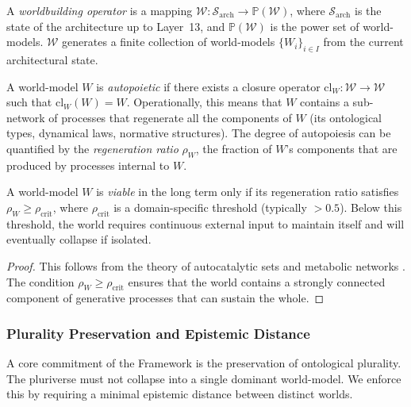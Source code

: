 \begin{definition}
A \emph{worldbuilding operator} is a mapping $\mathcal{W}: \mathcal{S}_{\text{arch}} \to \mathbb{P}(\mathcal{W})$, where $\mathcal{S}_{\text{arch}}$ is the state of the \Apeiron{} architecture up to Layer~13, and $\mathbb{P}(\mathcal{W})$ is the power set of world-models. $\mathcal{W}$ generates a finite collection of world-models $\{W_i\}_{i \in I}$ from the current architectural state.
\end{definition}

\begin{definition}
A world-model $W$ is \emph{autopoietic} if there exists a closure operator $\text{cl}_W: \mathcal{W} \to \mathcal{W}$ such that $\text{cl}_W(W) = W$. Operationally, this means that $W$ contains a sub-network of processes that regenerate all the components of $W$ (its ontological types, dynamical laws, normative structures). The degree of autopoiesis can be quantified by the \emph{regeneration ratio} $\rho_W$, the fraction of $W$'s components that are produced by processes internal to $W$.
\end{definition}

\begin{proposition}
\label{prop:autopoietic_threshold}
A world-model $W$ is \emph{viable} in the long term only if its regeneration ratio satisfies $\rho_W \ge \rho_{\text{crit}}$, where $\rho_{\text{crit}}$ is a domain-specific threshold (typically $> 0.5$). Below this threshold, the world requires continuous external input to maintain itself and will eventually collapse if isolated.
\end{proposition}
\begin{proof}
This follows from the theory of autocatalytic sets and metabolic networks \cite{kauffman1993origins}. The condition $\rho_W \ge \rho_{\text{crit}}$ ensures that the world contains a strongly connected component of generative processes that can sustain the whole.
\end{proof}

\subsubsection{Plurality Preservation and Epistemic Distance}
A core commitment of the \Apeiron{} Framework is the preservation of ontological plurality. The pluriverse must not collapse into a single dominant world-model. We enforce this by requiring a minimal epistemic distance between distinct worlds.

